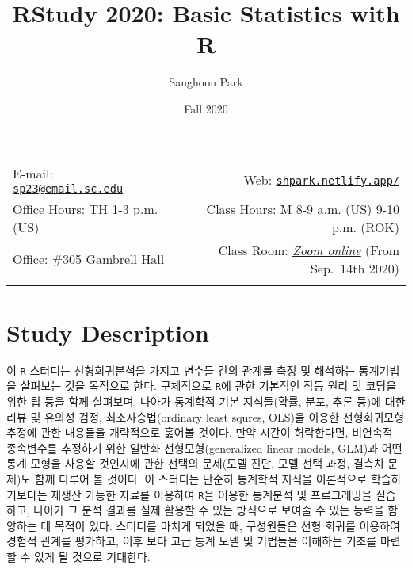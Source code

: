 \documentclass[11pt,]{article}
\title{RStudy 2020: Basic Statistics with R}
\author{Sanghoon Park}
\date{Fall 2020}
\begin{document}
  

		\maketitle
		
	
		\thispagestyle{firststyle}



	\noindent \begin{tabular*}{\textwidth}{ @{\extracolsep{\fill}} lr @{\extracolsep{\fill}}}


E-mail: \texttt{\href{mailto:sp23@email.sc.edu}{\nolinkurl{sp23@email.sc.edu}}} & Web: \href{http://shpark.netlify.app/}{\tt shpark.netlify.app/}\\
Office Hours: TH 1-3 p.m. (US)  &  Class Hours: M 8-9 a.m. (US) 9-10 p.m. (ROK)\\
Office: \#305 Gambrell Hall  & Class Room: \href{https://us02web.zoom.us/j/9013379527?pwd=akhTd0poRnNudUt5OGovejlWcW91QT09}{\emph{Zoom
online}} (From Sep.~14th 2020)\\
	&  \\
	\hline
	\end{tabular*}
	
\vspace{2mm}
	


\hypertarget{study-description}{%
\section{Study Description}\label{study-description}}

이 \texttt{R} 스터디는 선형회귀분석을 가지고 변수들 간의 관계를 측정 및
해석하는 통계기법을 살펴보는 것을 목적으로 한다. 구체적으로 \texttt{R}에
관한 기본적인 작동 원리 및 코딩을 위한 팁 등을 함께 살펴보며, 나아가
통계학적 기본 지식들(확률, 분포, 추론 등)에 대한 리뷰 및 유의성 검정,
최소자승법(ordinary least squres, OLS)을 이용한 선형회귀모형 추정에 관한
내용들을 개략적으로 훑어볼 것이다. 만약 시간이 허락한다면, 비연속적
종속변수를 추정하기 위한 일반화 선형모형(generalized linear models,
GLM)과 어떤 통계 모형을 사용할 것인지에 관한 선택의 문제(모델 진단, 모델
선택 과정, 결측치 문제)도 함께 다루어 볼 것이다. 이 스터디는 단순히
통계학적 지식을 이론적으로 학습하기보다는 재생산 가능한 자료를 이용하여
\texttt{R}을 이용한 통계분석 및 프로그래밍을 실습하고, 나아가 그 분석
결과를 실제 활용할 수 있는 방식으로 보여줄 수 있는 능력을 함양하는 데
목적이 있다. 스터디를 마치게 되었을 때, 구성원들은 선형 회귀를 이용하여
경험적 관계를 평가하고, 이후 보다 고급 통계 모델 및 기법들을 이해하는
기초를 마련할 수 있게 될 것으로 기대한다.
\end{document}
